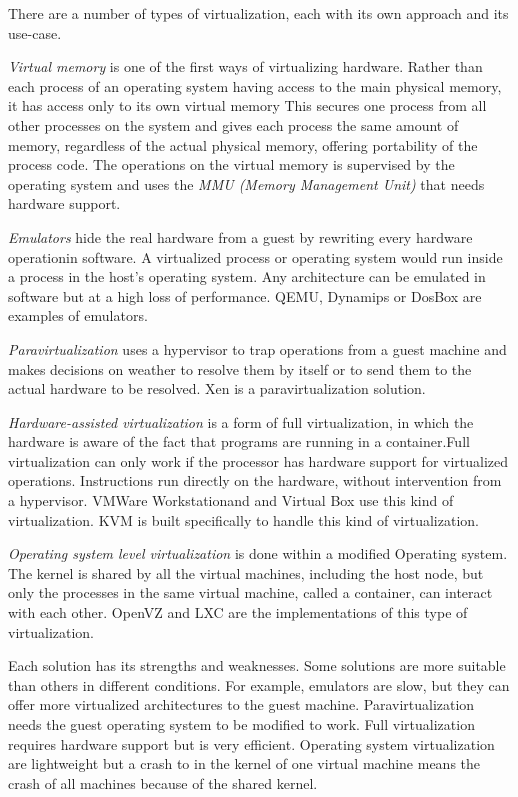 There are a number of types of virtualization, each with its own
approach and its use-case.

\emph{Virtual memory} is one of the first ways of virtualizing hardware.
Rather than each process of an operating system having access to the
main physical memory, it has access only to its own virtual memory This
secures one process from all other processes on the system and gives
each process the same amount of memory, regardless of the actual
physical memory, offering portability of the process code. The
operations on the virtual memory is supervised by the operating system
and uses the \emph{ MMU (Memory Management Unit)} that needs hardware
support.

\emph{Emulators} hide the real hardware from a guest by rewriting every
hardware operationin software. A virtualized process or operating system
would run inside a process in the host’s operating system. Any
architecture can be emulated in software but at a high loss of
performance. QEMU, Dynamips or DosBox are examples of emulators.

\emph{Paravirtualization} uses a hypervisor to trap operations from a
guest machine and makes decisions on weather to resolve them by itself
or to send them to the actual hardware to be resolved. Xen is a
paravirtualization solution.

\emph{Hardware-assisted virtualization} is a form of full
virtualization, in which the hardware is aware of the fact that programs
are running in a container.Full virtualization can only work if the
processor has hardware support for virtualized operations.  Instructions
run directly on the hardware, without intervention from a hypervisor.
VMWare Workstationand and  Virtual Box use this kind of virtualization.
KVM is built specifically to handle this kind of virtualization.

\emph{Operating system level virtualization} is done within a modified
Operating system. The kernel is shared by all the virtual machines,
including the host node, but only the processes in the same virtual
machine, called a container, can interact with each other.  OpenVZ and
LXC are the implementations of this type of virtualization.

Each solution has its strengths and weaknesses. Some solutions are more
suitable than others in different conditions. For example, emulators are
slow, but they can offer more virtualized architectures to the guest
machine. Paravirtualization needs the guest operating system to be
modified to work. Full virtualization requires hardware support but is
very efficient. Operating system virtualization are lightweight but a
crash to in the kernel of one virtual machine means the crash of all
machines because of the shared kernel.


